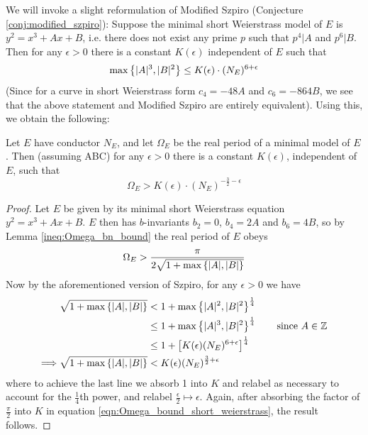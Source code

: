 \documentclass[10pt]{article}
\begin{document}
We will invoke a slight reformulation of Modified Szpiro (Conjecture \ref{conj:modified_szpiro}): Suppose the minimal short Weierstrass model of $E$ is $y^2 = x^3+Ax+B$, i.e. there does not exist any prime $p$ such that $p^4|A$ and $p^6|B$. Then for any $\epsilon>0$ there is a constant $K(\epsilon)$ independent of $E$ such that
\begin{equation}
\max\left\{|A|^3,|B|^2\right\} \le K(\epsilon)\cdot (N_E)^{6+\epsilon}
\end{equation}
(Since for a curve in short Weierstrass form $c_4 = -48A$ and $c_6=-864B$, we see that the above statement and Modified Szpiro are entirely equivalent). Using this, we obtain the following:
\begin{proposition}
Let $E$ have conductor $N_E$, and let $\Omega_E$ be the real period of a minimal model of $E$. Then (assuming ABC) for any $\epsilon>0$ there is a constant $K(\epsilon)$, independent of $E$, such that 
\begin{equation}
\Omega_E > K(\epsilon) \cdot (N_E)^{-\frac{3}{2}-\epsilon}
\end{equation}
\end{proposition}
\begin{proof}
Let $E$ be given by its minimal short Weierstrass equation $y^2 = x^3+Ax+B$. $E$ then has $b$-invariants $b_2=0$, $b_4 = 2A$ and $b_6 = 4B$, so by Lemma \ref{ineq:Omega_bn_bound} the real period of $E$ obeys
\begin{equation}\label{eqn:Omega_bound_short_weierstrass}
\Omega_E > \frac{\pi}{2\sqrt{1+\max\left\{|A|,|B|\right\}}}
\end{equation}
Now by the aforementioned version of Szpiro, for any $\epsilon>0$ we have
\begin{align*}
\sqrt{1+\max\left\{|A|,|B|\right\}} &<  1 + \max\left\{|A|^2,|B|^2\right\}^\frac{1}{4} \\
&\le 1 + \max\left\{|A|^3,|B|^2\right\}^\frac{1}{4} \quad\quad\mbox{since $A \in \mathbb{Z}$} \\
&\le 1 +\left[K(\epsilon) (N_E)^{6+\epsilon} \right]^\frac{1}{4} \\
\Longrightarrow \sqrt{1+\max\left\{|A|,|B|\right\}} &< K(\epsilon) (N_E)^{\frac{3}{2}+\epsilon}
\end{align*}
where to achieve the last line we absorb 1 into $K$ and relabel as necessary to account for the $\frac{1}{4}$th power, and relabel $\frac{\epsilon}{2} \mapsto \epsilon$. Again, after absorbing the factor of $\frac{\pi}{2}$ into $K$ in equation \ref{eqn:Omega_bound_short_weierstrass}, the result follows.
\end{proof}
\end{document}
